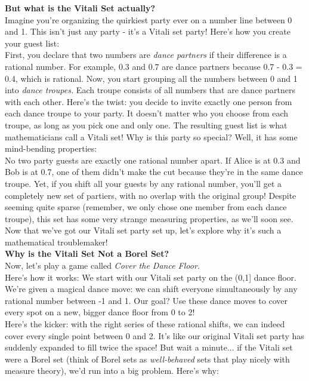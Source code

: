 \textbf{But what is the Vitali Set actually?}\\

Imagine you're organizing the quirkiest party ever on a number line between 0 and 1. This isn't just any party - it's a Vitali set party! Here's how you create your guest list: \\

First, you declare that two numbers are \textit{dance partners} if their difference is a rational number. For example, 0.3 and 0.7 are dance partners because 0.7 - 0.3 = 0.4, which is rational. Now, you start grouping all the numbers between 0 and 1 into \textit{dance troupes.} Each troupe consists of all numbers that are dance partners with each other. Here's the twist: you decide to invite exactly one person from each dance troupe to your party. It doesn't matter who you choose from each troupe, as long as you pick one and only one. The resulting guest list is what mathematicians call a Vitali set! Why is this party so special? Well, it has some mind-bending properties: \\

No two party guests are exactly one rational number apart. If Alice is at 0.3 and Bob is at 0.7, one of them didn't make the cut because they're in the same dance troupe. Yet, if you shift all your guests by any rational number, you'll get a completely new set of partiers, with no overlap with the original group! Despite seeming quite sparse (remember, we only chose one member from each dance troupe), this set has some very strange measuring properties, as we'll soon see. \\

Now that we've got our Vitali set party set up, let's explore why it's such a mathematical troublemaker! \\

\textbf{Why is the Vitali Set Not a Borel Set?}\\

Now, let's play a game called \textit{Cover the Dance Floor.} \\

Here's how it works: We start with our Vitali set party on the (0,1] dance floor. We're given a magical dance move: we can shift everyone simultaneously by any rational number between -1 and 1. Our goal? Use these dance moves to cover every spot on a new, bigger dance floor from 0 to 2!\\

Here's the kicker: with the right series of these rational shifts, we can indeed cover every single point between 0 and 2. It's like our original Vitali set party has suddenly expanded to fill twice the space! But wait a minute... if the Vitali set were a Borel set (think of Borel sets as \textit{well-behaved} sets that play nicely with measure theory), we'd run into a big problem. Here's why:\\


